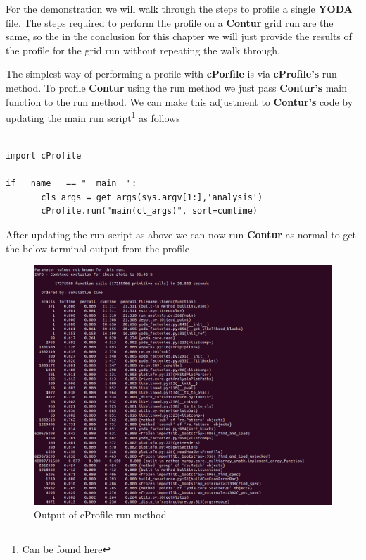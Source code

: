 For the demonstration we will walk through the steps to profile a single \textbf{YODA} file. The steps required to perform the profile on a \textbf{Contur} grid run are the same, so the in the conclusion for this chapter we will just provide the results of the profile for the grid run without repeating the walk through.

The simplest way of performing a profile with \textbf{cPorfile} is via \textbf{cProfile's} run method. To profile \textbf{Contur} using the run method we just pass \textbf{Contur's} main function to the run method. We can make this adjustment to \textbf{Contur's} code by updating the main run script\footnote{Can be found \href{https://gitlab.com/hepcedar/contur/-/blob/main/bin/contur}{here}} as follows 

\begin{verbatim}

import cProfile

if __name__ == "__main__":
       cls_args = get_args(sys.argv[1:],'analysis')
       cProfile.run("main(cl_args)", sort=cumtime)

\end{verbatim}


After updating the run script as above we can now run \textbf{Contur} as normal to get the below terminal output from the profile

\begin{figure}[H]
\centering
\includegraphics[scale=0.35]{plots/example_profile.png}
\caption{Output of cProfile run method}
\label{fig:ep}
\end{figure}

